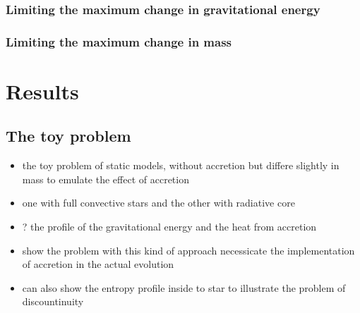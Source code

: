 \documentclass[12pt,a4paper]{article}
\newcommand{\mr}{\mathrm}
\newenvironment{outline}[1]{%
  \begin{itemize}[label=\textbullet]%
  \color{#1}%
}{%
  \end{itemize}%
}
\begin{document}
\subsubsection{Limiting the maximum change in gravitational energy}
\label{sec:limiting_grav_energy}

\subsubsection{Limiting the maximum change in mass}
\label{sec:limiting_mass_change}





\section{Results}
\label{sec:results}

\subsection{The toy problem}
\label{sec:toy_problem}
\begin{outline}{gray}
  \item the toy problem of static models, without accretion but differe slightly in mass to emulate the effect of accretion
  \item one with full convective stars and the other with radiative core
  \item ? the profile of the gravitational energy and the heat from accretion
  \item show the problem with this kind of approach necessicate the implementation of accretion in the actual evolution 
  \item can also show the entropy profile inside to star to illustrate the problem of discountinuity
\end{outline}
\end{document}

